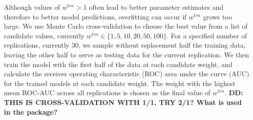 \documentclass{bmcart}
\begin{document}
\begin{backmatter}
Although values of $w^{trn} > 1$ often lead to better parameter estimates and therefore to better model predictions, 
overfitting can occur if $w^{trn}$ grows too large.  We use Monte Carlo cross-validation \citep{Shao1993a} to choose the 
best value from a list of candidate values, currently $w^{trn} \in \{1, 5, 10, 20, 50, 100\}$.  For a specified number of 
replications, currently 30, we sample without replacement half the training data, leaving the other half to serve as testing 
data for the current replication.  We then train the model with 
the first half of the data at each candidate weight, and calculate the receiver operating characteristic (ROC) area under the 
curve (AUC) for the trained models at each candidate weight.  The weight with the highest mean ROC-AUC across all 
replications is chosen as the final value of $w^{trn}$. \textbf{DD: THIS IS CROSS-VALIDATION WITH 1/1, TRY 2/1? What is used in the package?}



\end{backmatter}
\end{document}

